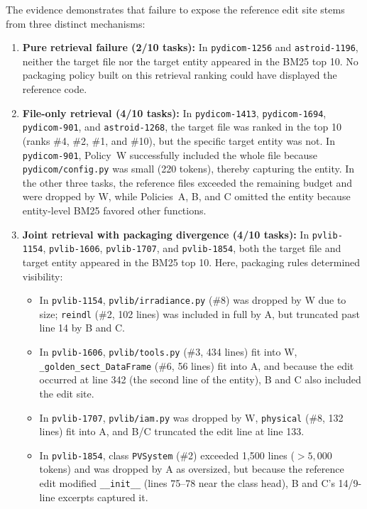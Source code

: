 \documentclass[11pt]{article}
\begin{document}
The evidence demonstrates that failure to expose the reference edit site
stems from three distinct mechanisms:
\begin{enumerate}[nosep]
  \item \textbf{Pure retrieval failure (2/10 tasks):} In \texttt{pydicom-1256}
    and \texttt{astroid-1196}, neither the target file nor the target entity
    appeared in the BM25 top 10.  No packaging policy built on this retrieval
    ranking could have displayed the reference code.
  \item \textbf{File-only retrieval (4/10 tasks):} In \texttt{pydicom-1413},
    \texttt{pydicom-1694}, \texttt{pydicom-901}, and \texttt{astroid-1268},
    the target file was ranked in the top 10 (ranks \#4, \#2, \#1, and \#10),
    but the specific target entity was not.  In \texttt{pydicom-901}, Policy~W
    successfully included the whole file because \nolinkurl{pydicom/config.py}
    was small (220 tokens), thereby capturing the entity.  In the other three
    tasks, the reference files exceeded the remaining budget and were dropped
    by W, while Policies~A, B, and C omitted the entity because entity-level
    BM25 favored other functions.
  \item \textbf{Joint retrieval with packaging divergence (4/10 tasks):} In
    \texttt{pvlib-1154}, \texttt{pvlib-1606}, \texttt{pvlib-1707}, and
    \texttt{pvlib-1854}, both the target file and target entity appeared in
    the BM25 top 10.  Here, packaging rules determined visibility:
    \begin{itemize}[nosep]
      \item In \texttt{pvlib-1154}, \texttt{pvlib/irradiance.py} (\#8) was
        dropped by W due to size; \nolinkurl{reindl} (\#2, 102 lines) was
        included in full by A, but truncated past line 14 by B and C.
      \item In \texttt{pvlib-1606}, \nolinkurl{pvlib/tools.py} (\#3, 434 lines)
        fit into W, \nolinkurl{_golden_sect_DataFrame} (\#6, 56 lines) fit
        into A, and because the edit occurred at line 342 (the second line of
        the entity), B and C also included the edit site.
      \item In \texttt{pvlib-1707}, \nolinkurl{pvlib/iam.py} was dropped by W,
        \nolinkurl{physical} (\#8, 132 lines) fit into A, and B/C truncated
        the edit line at line 133.
      \item In \texttt{pvlib-1854}, class \nolinkurl{PVSystem} (\#2) exceeded
        1{,}500 lines ($>5{,}000$ tokens) and was dropped by A as oversized,
        but because the reference edit modified \nolinkurl{__init__} (lines
        75--78 near the class head), B and C's 14/9-line excerpts captured it.
    \end{itemize}
\end{enumerate}
\end{document}
